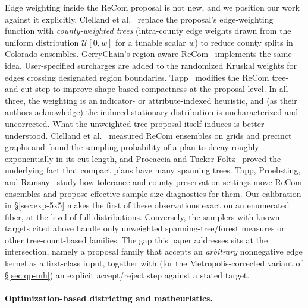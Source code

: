 \documentclass[11pt]{article}
\begin{document}
Edge weighting inside the ReCom proposal is not new, and we position
our work against it explicitly. Clelland et
al.~\cite{clelland2022colorado} replace the proposal's edge-weighting
function with \emph{county-weighted trees} (intra-county edge
weights drawn from the uniform distribution $\mathcal{U}[0, w]$ for a tunable scalar $w$) to reduce county splits in Colorado ensembles. GerryChain's
region-aware ReCom~\cite{gerrychain2024} implements the same idea.
User-specified surcharges are added to the randomized Kruskal weights
for edges crossing designated region boundaries. Tapp~\cite{tapp2025compactness}
modifies the ReCom tree-and-cut step to improve shape-based
compactness at the proposal level. In all three, the weighting is an
indicator- or attribute-indexed heuristic, and (as their authors
acknowledge) the induced stationary distribution is uncharacterized
and uncorrected. What the unweighted tree proposal itself induces is
better understood. Clelland et al.~\cite{clelland2021compactness}
measured ReCom ensembles on grids and precinct graphs and found the
sampling probability of a plan to decay roughly exponentially in its
cut length, and Procaccia and
Tucker-Foltz~\cite{procaccia2022compact} proved the underlying fact
that compact plans have many spanning trees. Tapp, Proebsting, and
Ramsay~\cite{tapp2025parameter} study how tolerance and
county-preservation settings move ReCom ensembles and propose
effective-sample-size diagnostics for them. Our calibration in
\S\ref{sec:exp-5x5} makes the first of these observations exact on an
enumerated fiber, at the level of full distributions. Conversely, the
samplers with known targets cited above handle only unweighted
spanning-tree/forest measures or other tree-count-based families. The gap this paper addresses sits at the
intersection, namely a proposal family that accepts an \emph{arbitrary}
nonnegative edge kernel as a first-class input, together with (for the
Metropolis-corrected variant of \S\ref{sec:qp-mh}) an explicit
accept/reject step against a stated target.

\paragraph{Optimization-based districting and matheuristics.}\label{sec:related-opt}
\end{document}
